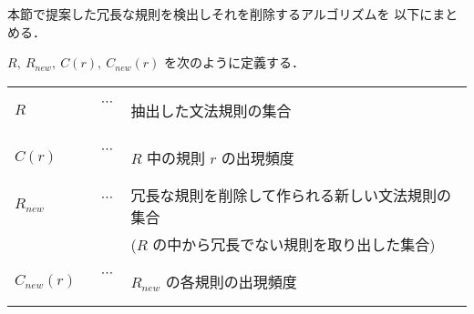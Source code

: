 本節で提案した冗長な規則を検出しそれを削除するアルゴリズムを
以下にまとめる．

\begin{flushleft}
  \vspace*{2mm}{\bf 【冗長規則削除アルゴリズム】}
  \vspace*{-3mm}
\end{flushleft}

$R, ~ R_{new}, ~ C(r), ~ C_{new}(r)$ を次のように定義する．
\begin{center}
  \begin{tabular}{lcl}
    $R$          & ~$\cdots$~ &
      抽出した文法規則の集合 \\
    $C(r)$       & ~$\cdots$~ &
      $R$ 中の規則 $r$ の出現頻度 \\
    $R_{new}$    & ~$\cdots$~ &
      冗長な規則を削除して作られる新しい文法規則の集合 \\
    &&($R$ の中から冗長でない規則を取り出した集合) \\
    $C_{new}(r)$ & ~$\cdots$~ &
      $R_{new}$ の各規則の出現頻度 \\
  \end{tabular}
\end{center}


